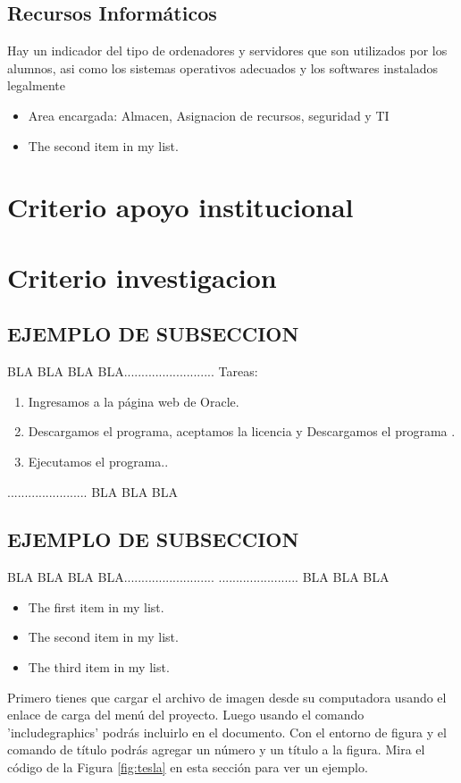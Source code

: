 \documentclass[12pt,a4paper]{report}
\begin{document}
\subsection{Recursos Informáticos }
Hay un indicador del tipo de ordenadores y servidores que son utilizados por los alumnos,  asi como los sistemas operativos adecuados y los softwares instalados legalmente
\begin{itemize}
\item Area encargada: Almacen, Asignacion de recursos, seguridad y TI
\item The second item in my list.
\end{itemize}


\section{ Criterio apoyo institucional}

\section{ Criterio investigacion}

\subsection{EJEMPLO DE SUBSECCION}
BLA BLA BLA BLA..........................
Tareas:
\begin{enumerate}
    \item Ingresamos a la página web de Oracle.
    \item Descargamos el programa, aceptamos la licencia y Descargamos el programa .
    \item Ejecutamos el programa..
\end{enumerate}
....................... BLA BLA BLA
\subsection{EJEMPLO DE SUBSECCION}
BLA BLA BLA BLA..........................
....................... BLA BLA BLA
\begin{itemize}
\item The first item in my list. 
\item The second item in my list.
\item The third item in my list.
\end{itemize}
Primero tienes que cargar el archivo de imagen desde su computadora usando el enlace de carga del menú del proyecto. Luego usando el comando 'includegraphics' podrás incluirlo en el documento. Con el entorno de figura y el comando de título podrás agregar un número y un título a la figura. Mira el código de la Figura \ref{fig:tesla} en esta sección para ver un ejemplo.
\end{document}
